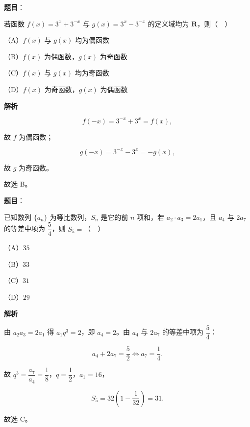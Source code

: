 \begin{answer}

\textbf{题目}：

若函数 $f(x)=3^x+3^{-x}$ 与 $g(x)=3^x-3^{-x}$ 的定义域均为 $\mathbf R$，则（　）

（A）$f(x)$ 与 $g(x)$ 均为偶函数

（B）$f(x)$ 为偶函数，$g(x)$ 为奇函数

（C）$f(x)$ 与 $g(x)$ 均为奇函数

（D）$f(x)$ 为奇函数，$g(x)$ 为偶函数

\textbf{解析}

\nopagebreak[4]
\[f(-x)=3^{-x}+3^x=f(x),\]

故 $f$ 为偶函数；

\nopagebreak[4]
\[g(-x)=3^{-x}-3^x=-g(x),\]

故 $g$ 为奇函数。

故选 B。


\end{answer}
\begin{answer}

\textbf{题目}：

已知数列 $\{a_n\}$ 为等比数列，$S_n$ 是它的前 $n$ 项和，若 $a_2\cdot a_3=2a_1$，且 $a_4$ 与 $2a_7$ 的等差中项为 $\dfrac54$，则 $S_5=$（　）

（A）$35$

（B）$33$

（C）$31$

（D）$29$

\textbf{解析}

由 $a_2a_3=2a_1$ 得 $a_1q^3=2$，即 $a_4=2$。由 $a_4$ 与 $2a_7$ 的等差中项为 $\dfrac54$：

\nopagebreak[4]
\[a_4+2a_7=\frac52\iff a_7=\frac14.\]

故 $q^3=\dfrac{a_7}{a_4}=\dfrac18$，$q=\dfrac12$，$a_1=16$，

\nopagebreak[4]
\[S_5=32\left(1-\frac1{32}\right)=31.\]

故选 C。


\end{answer}
